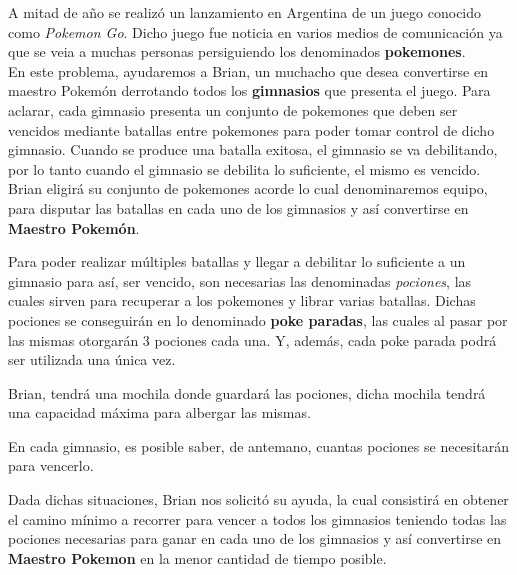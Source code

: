 A mitad de año se realiz\'o un lanzamiento en Argentina de un juego conocido como \textit{Pokemon Go}. Dicho juego fue noticia en varios medios de comunicaci\'on ya que se veia a muchas personas persiguiendo los denominados \textbf{pokemones}.\\

En este problema, ayudaremos a Brian, un muchacho que desea convertirse en maestro Pokem\'on derrotando todos los \textbf{gimnasios} que presenta el juego. Para aclarar, cada gimnasio presenta un conjunto de pokemones que deben ser vencidos mediante batallas entre pokemones para poder tomar control de dicho gimnasio. Cuando se produce una batalla exitosa, el gimnasio se va debilitando, por lo tanto cuando el gimnasio se debilita lo suficiente, el mismo es vencido.\\

Brian eligir\'a su conjunto de pokemones acorde lo cual denominaremos equipo, para  disputar las batallas en cada uno de los gimnasios y as\'i convertirse en \textbf{Maestro Pokem\'on}.

Para poder realizar m\'ultiples batallas y llegar a debilitar lo suficiente a un gimnasio para as\'i, ser vencido, son necesarias las denominadas \textit{pociones}, las cuales sirven para recuperar a los pokemones y librar varias batallas. Dichas pociones se conseguir\'an en lo denominado \textbf{poke paradas}, las cuales al pasar por las mismas otorgar\'an 3 pociones cada una. Y, adem\'as, cada poke parada podr\'a ser utilizada una \'unica vez. 

Brian, tendr\'a una mochila donde guardar\'a las pociones, dicha mochila tendr\'a una capacidad m\'axima para albergar las mismas.

En cada gimnasio, es posible saber, de antemano, cuantas pociones se necesitar\'an para vencerlo.

Dada dichas situaciones, Brian nos solicit\'o su ayuda, la cual consistir\'a en obtener el camino m\'inimo a recorrer para vencer a todos los gimnasios teniendo todas las pociones necesarias para ganar en cada uno de los gimnasios y as\'i convertirse en \textbf{Maestro Pokemon} en la menor cantidad de tiempo posible.